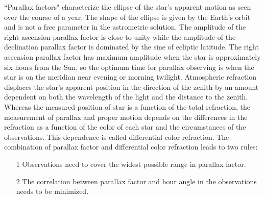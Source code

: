 ``Parallax factors" characterize the ellipse of the star's apparent motion as seen over the course of a year. The shape of the ellipse is given by the Earth's orbit and is not a free parameter in the astrometric solution. The amplitude of the right ascension parallax factor is close to unity while the amplitude of the declination parallax factor is dominated by the sine of ecliptic latitude.
The right ascension parallax factor has maximum amplitude when the star is approximately six hours from the Sun, so the optimum time for parallax observing is when the
star is on the meridian near evening or morning twilight. Atmospheric refraction displaces the star's apparent position in the direction of the zenith by an amount dependent on both the wavelength of the light and the distance to the zenith. Whereas the measured position of star is a function of the total refraction, the measurement of parallax
and proper motion depends on the differences in the refraction as a function of the color of each star and the circumstances of the observations.  This
dependence is called differential color refraction. The combination of parallax factor and differential color refraction leads to two rules:
\begin{itemize}
\item [1] Observations need to cover the widest possible range in parallax
factor.
\item [2] The correlation between parallax factor and hour angle in the observations needs to be minimized.
\end{itemize}




